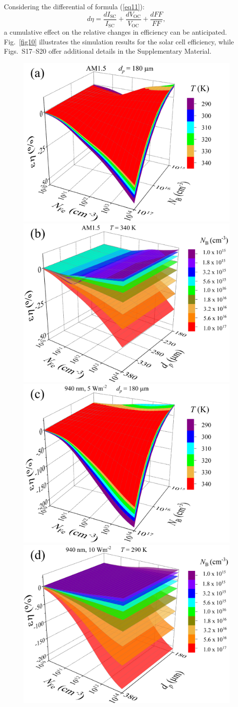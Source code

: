 \documentclass[a4paper,fleqn]{cas-sc}
\begin{document}
Considering the differential of formula (\ref{eq11}):
\begin{equation}
\label{eq12}
    d\eta = \frac{dI_\mathrm{SC}}{I_\mathrm{SC}}+\frac{dV_\mathrm{OC}}{V_\mathrm{OC}}+\frac{dFF}{FF},
\end{equation}
a cumulative effect on the relative changes in efficiency can be anticipated.
Fig.~\ref{fig10} illustrates the simulation results for the solar cell efficiency,
while Figs.~S17–S20 offer additional details in the Supplementary Material.


\begin{figure}
	\centering
     \includegraphics[width=0.49\linewidth]{Fig10a.png}
     \includegraphics[width=0.49\linewidth]{Fig10b.png}
     \includegraphics[width=0.49\linewidth]{Fig10c.png}
     \includegraphics[width=0.49\linewidth]{Fig10d.png}

\end{figure}
\end{document}
